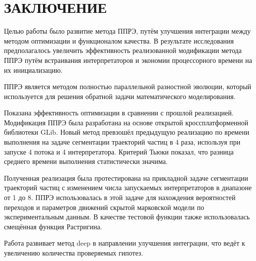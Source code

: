 \chapter*{ЗАКЛЮЧЕНИЕ}

Целью работы было развитие метода ППРЭ,
путём улучшения интеграции
между методом оптимизации
и функционалом качества.
В результате исследования
предполагалось увеличить
эффективность реализованной
модификации метода ППРЭ
путём встраивания интерпретаторов
и экономии процессорного времени
на их инициализацию.

ППРЭ является методом
полностью параллельной разностной эволюции,
который используется для решения
обратной задачи математического моделирования.

Показана эффективность
оптимизации в сравнении с
прошлой реализацией.
Модификация ППРЭ
была разработана на основе
открытой кроссплатформенной
библиотеки GLib.
Новый метод
превзошёл предыдущую реализацию
по времени выполнения на задаче
сегментации траекторий частиц
в 4 раза, используя при запуске
4 потока и 4 интерпретатора.
Критерий Тьюки показал,
что разница среднего времени
выполнения статистически значима.

Полученная реализация
была протестирована на
прикладной задаче
сегментации траекторий частиц
с изменением числа запускаемых
интерпретаторов в диапазоне
от 1 до 8.
ППРЭ использовалась в этой задаче
для нахождения вероятностей переходов и
параметров движений
скрытой марковской модели по
экспериментальным данным.
В качестве тестовой функции
также использовалась
смещённая функция Растригина.

Работа развивает метод deep
в направлении улучшения интеграции,
что ведёт к увеличению количества
проверяемых гипотез.

